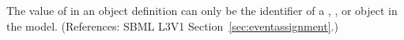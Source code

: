 The value of  in an \EventAssignment object definition can
only be the identifier of a \Compartment, \Species, \Parameter or
\SpeciesReference object in the model.  (References: SBML L3V1
Section~\ref{sec:eventassignment}.)
